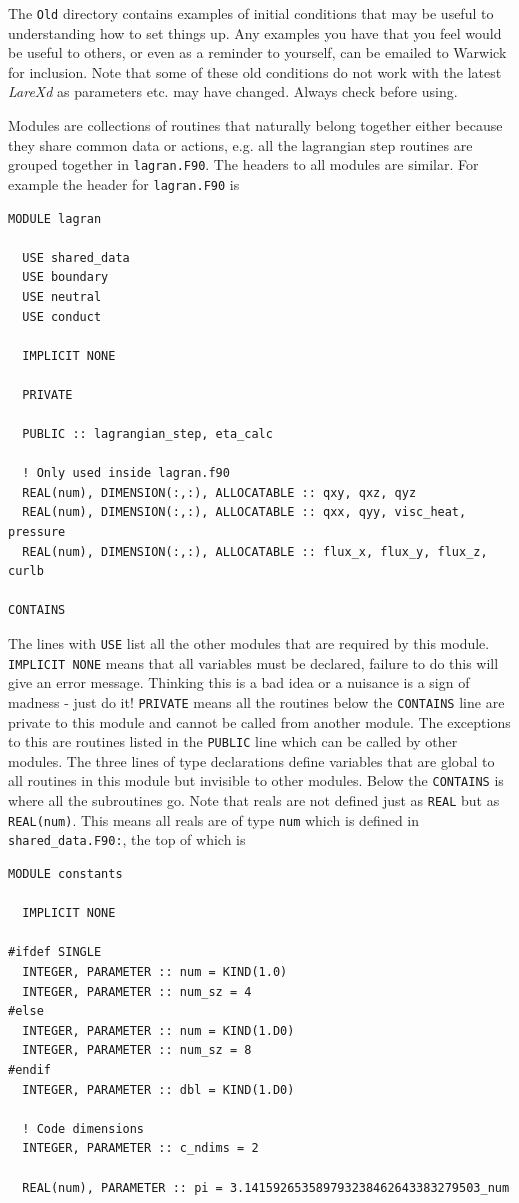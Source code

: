 \documentclass[11pt]{article}
\begin{document}
The \texttt{Old} directory contains examples of initial conditions that may be useful to understanding how to set 
things up. Any examples you have that you feel would be useful to others, or even as a reminder to yourself, can 
be emailed to Warwick for inclusion. Note that some of these old conditions do not work with the latest {\it LareXd} 
as parameters etc. may have changed. Always check before using.

Modules are collections of routines that naturally belong together either because they share common data or actions, 
e.g. all the lagrangian step routines are grouped together in \texttt{lagran.F90}. The headers to all modules are 
similar. For example the header for \texttt{lagran.F90} is

\begin{verbatim}
MODULE lagran

  USE shared_data
  USE boundary
  USE neutral
  USE conduct

  IMPLICIT NONE

  PRIVATE

  PUBLIC :: lagrangian_step, eta_calc

  ! Only used inside lagran.f90
  REAL(num), DIMENSION(:,:), ALLOCATABLE :: qxy, qxz, qyz
  REAL(num), DIMENSION(:,:), ALLOCATABLE :: qxx, qyy, visc_heat, pressure
  REAL(num), DIMENSION(:,:), ALLOCATABLE :: flux_x, flux_y, flux_z, curlb

CONTAINS
\end{verbatim}
The lines with \texttt{USE} list all the other modules that are required by this module. \texttt{IMPLICIT NONE} 
means that all variables must be declared, failure to do this will give an error message. Thinking this is a bad 
idea or a nuisance is a sign of madness - just do it! \texttt{PRIVATE} means all the routines below the \texttt{CONTAINS} 
line are private to this module and cannot be called from another module. The exceptions to this are routines listed 
in the \texttt{PUBLIC} line which can be called by other modules. The three lines of type declarations define variables 
that are global to all routines in this module but invisible to other modules. Below the \texttt{CONTAINS} is where 
all the subroutines go. Note that reals are not defined just as \texttt{REAL} but as \texttt{REAL(num)}. This means 
all reals are of type \texttt{num} which is defined in {\texttt{shared\_data.F90:}}, the top of which is
\begin{verbatim}
MODULE constants

  IMPLICIT NONE

#ifdef SINGLE
  INTEGER, PARAMETER :: num = KIND(1.0)
  INTEGER, PARAMETER :: num_sz = 4
#else
  INTEGER, PARAMETER :: num = KIND(1.D0)
  INTEGER, PARAMETER :: num_sz = 8
#endif
  INTEGER, PARAMETER :: dbl = KIND(1.D0)

  ! Code dimensions
  INTEGER, PARAMETER :: c_ndims = 2

  REAL(num), PARAMETER :: pi = 3.141592653589793238462643383279503_num
\end{verbatim}
\end{document}
